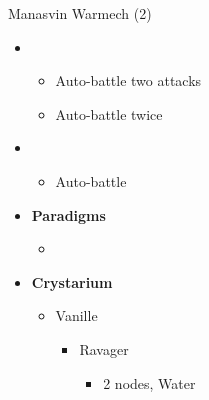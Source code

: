 \begin{multicols}{2}
\begin{battle}{Manasvin Warmech (2)}
\begin{itemize}
    \item \third
    \begin{itemize}
        \item Auto-battle two attacks
        \item Auto-battle twice
    \end{itemize}
    \item \fourth
    \begin{itemize}
        \item Auto-battle
    \end{itemize}
\end{itemize}
\end{battle}

\begin{menu}
\begin{itemize}
    \item \textbf{Paradigms}
    \begin{itemize}
        \item {}%
{\paradigmline[1]{\textit{\com}}{\textit{\rav}}{\textit{\rav}}}%
{\paradigmline{\com}{\med}{\rav}}%
{\paradigmline{[\rav]}{\rav}{\rav}}%
{\paradigmline{[\rav]}{\rav}{\rav}}%
{\paradigmline{[\com]}{\rav}{\rav}}
    \end{itemize}
    \item \textbf{Crystarium}
    \begin{itemize}
        \item Vanille
        \begin{itemize}
            \item Ravager
            \begin{itemize}
                \item 2 nodes, Water
            \end{itemize}
        \end{itemize}
    \end{itemize}
\end{itemize}
\end{menu}

\renewcommand{\first}{[1] Relentless Assault (\com/\rav/\rav)}
\renewcommand{\second}{[2] Diversity (\com/\med/\rav)}
\renewcommand{\third}{[3] Tri-Disaster (\rav/\rav/\rav)}
\renewcommand{\fourth}{[4] Tri-Disaster (\rav/\rav/\rav)}
\renewcommand{\fifth}{[5] Relentless Assault (\com/\rav/\rav)}

\vfill


\end{multicols}
